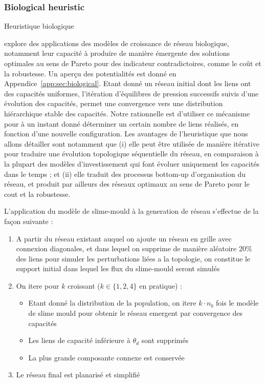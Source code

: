 \subsubsection{Biological heuristic}{Heuristique biologique}

\cite{raimbault2015labex} explore des applications des modèles de croissance de réseau biologique, notamment leur capacité à produire de manière émergente des solutions optimales au sens de Pareto pour des indicateur contradictoires, comme le coût et la robustesse. Un aperçu des potentialités est donné en Appendice~\ref{app:sec:biological}. Etant donné un réseau initial dont les liens ont des capacités uniformes, l'itération d'équilibres de pression successifs suivis d'une évolution des capacités, permet une convergence vers une distribution hiérarchique stable des capacités. Notre rationnelle est d'utiliser ce mécanisme pour à un instant donné déterminer un certain nombre de liens réalisés, en fonction d'une nouvelle configuration. Les avantages de l'heuristique que nous allons détailler sont notamment que (i) elle peut être utilisée de manière itérative pour traduire une évolution topologique séquentielle du réseau, en comparaison à la plupart des modèles d'investissement qui font évoluer uniquement les capacités dans le temps ; et (ii) elle traduit des processus bottom-up d'organisation du réseau, et produit par ailleurs des réseaux optimaux au sens de Pareto pour le cout et la robustesse.


L'application du modèle de slime-mould à la generation de réseau s'effectue de la façon suivante :

\begin{enumerate}
	\item A partir du réseau existant auquel on ajoute un réseau en grille avec connexion diagonales, et dans lequel on supprime de manière aléatoire 20\% des liens pour simuler les perturbations liées a la topologie, on constitue le support initial dans lequel les flux du slime-mould seront simulés 
	\item On itere pour $k$ croissant ($k\in \{ 1,2,4 \}$ en pratique) :
	\begin{itemize}
		\item Etant donné la distribution de la population, on itere $k\cdot n_b$ fois le modèle de slime mould pour obtenir le réseau emergent par convergence des capacités
		\item Les liens de capacité inférieure à $\theta_d$ sont supprimés
		\item La plus grande composante connexe est conservée
	\end{itemize}
	\item Le réseau final est planarisé et simplifié
\end{enumerate}



